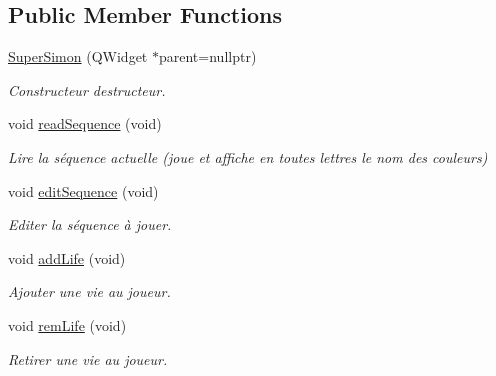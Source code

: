 \subsection*{Public Member Functions}
\begin{DoxyCompactItemize}
\item 
\mbox{\label{class_super_simon_a203f799a56234b59ba692ed5b7a74537}} 
\hyperlink{class_super_simon_a203f799a56234b59ba692ed5b7a74537}{Super\+Simon} (Q\+Widget $\ast$parent=nullptr)
\begin{DoxyCompactList}\small\item\em Constructeur destructeur. \end{DoxyCompactList}\item 
\mbox{\label{class_super_simon_a1676872fe3b03afef6ce057beae773b8}} 
void \hyperlink{class_super_simon_a1676872fe3b03afef6ce057beae773b8}{read\+Sequence} (void)
\begin{DoxyCompactList}\small\item\em Lire la séquence actuelle (joue et affiche en toutes lettres le nom des couleurs) \end{DoxyCompactList}\item 
void \hyperlink{class_super_simon_af00408823847e80a511019baa536afb3}{edit\+Sequence} (void)
\begin{DoxyCompactList}\small\item\em Editer la séquence à jouer. \end{DoxyCompactList}\item 
\mbox{\label{class_super_simon_a611cecfe4b8945c9ce70c206e64a6038}} 
void \hyperlink{class_super_simon_a611cecfe4b8945c9ce70c206e64a6038}{add\+Life} (void)
\begin{DoxyCompactList}\small\item\em Ajouter une vie au joueur. \end{DoxyCompactList}\item 
\mbox{\label{class_super_simon_a081108169be3715de506ccaebebf01d9}} 
void \hyperlink{class_super_simon_a081108169be3715de506ccaebebf01d9}{rem\+Life} (void)
\begin{DoxyCompactList}\small\item\em Retirer une vie au joueur. \end{DoxyCompactList}\item 

\end{DoxyCompactItemize}
